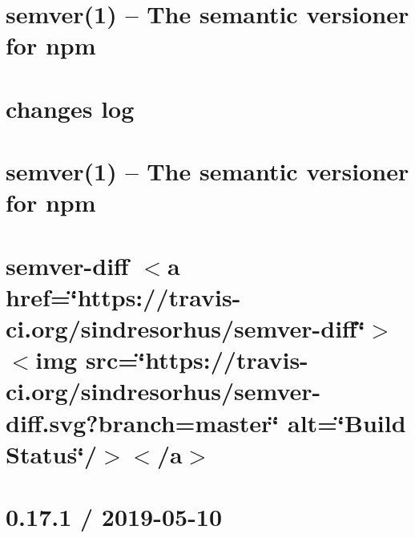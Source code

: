 \let\mypdfximage\pdfximage\def\pdfximage{\immediate\mypdfximage}\documentclass[twoside]{book}
\newcommand{\+}{\discretionary{\mbox{\scriptsize$\hookleftarrow$}}{}{}}
\begin{document}
\chapter{semver(1) -- The semantic versioner for npm}
\label{md__c_1__git_hub__p_r_o_y_e_c_t_o-_i_i_i-_g_o_t_rest-api-node-mysql_node_modules_semver__r_e_a_d_m_e}

\chapter{changes log}
\label{md__c_1__git_hub__p_r_o_y_e_c_t_o-_i_i_i-_g_o_t_rest-api-node-mysql_node_modules_semver-diff_nodb3ab2674bafdd737bace803c6abee5a8}

\chapter{semver(1) -- The semantic versioner for npm}
\label{md__c_1__git_hub__p_r_o_y_e_c_t_o-_i_i_i-_g_o_t_rest-api-node-mysql_node_modules_semver-diff_node_modules_semver__r_e_a_d_m_e}

\chapter{semver-\/diff $<$a href=\char`\"{}https\+://travis-\/ci.\+org/sindresorhus/semver-\/diff\char`\"{}$>$$<$img src=\char`\"{}https\+://travis-\/ci.\+org/sindresorhus/semver-\/diff.\+svg?branch=master\char`\"{} alt=\char`\"{}\+Build Status\char`\"{}/$>$$<$/a$>$}
\label{md__c_1__git_hub__p_r_o_y_e_c_t_o-_i_i_i-_g_o_t_rest-api-node-mysql_node_modules_semver-diff_readme}

\chapter{0.17.1 / 2019-\/05-\/10}
\label{md__c_1__git_hub__p_r_o_y_e_c_t_o-_i_i_i-_g_o_t_rest-api-node-mysql_node_modules_send__h_i_s_t_o_r_y}

\end{document}
